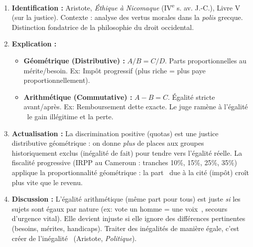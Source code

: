 \documentclass[11pt]{article}
\newcommand{\cle}[1]{{\popxbold\color{popdark}#1}}
\begin{document}
\begin{corrige}
\begin{enumerate}
    \item \textbf{Identification :} Aristote, \emph{Éthique à Nicomaque} (IV\textsuperscript{e} s. av. J.-C.), Livre V (sur la justice). Contexte : analyse des vertus morales dans la \emph{polis} grecque. Distinction fondatrice de la philosophie du droit occidental.
    \item \textbf{Explication :}
        \begin{itemize}
            \item \textbf{Géométrique (Distributive) :} $A/B = C/D$. Parts proportionnelles au mérite/besoin. Ex: Impôt progressif (plus riche = plus paye proportionnellement).
            \item \textbf{Arithmétique (Commutative) :} $A - B = C$. Égalité stricte avant/après. Ex: Remboursement dette exacte. Le juge \guillemotleft ramène à l'égalité \guillemotright\ le gain illégitime et la perte.
        \end{itemize}
    \item \textbf{Actualisation :} La \cle{discrimination positive} (quotas) est une justice distributive géométrique : on donne \emph{plus} de places aux groupes historiquement exclus (inégalité de fait) pour tendre vers l'égalité réelle. La fiscalité progressive (IRPP au Cameroun : tranches 10\%, 15\%, 25\%, 35\%) applique la proportionnalité géométrique : la \guillemotleft part \guillemotright\ due à la cité (impôt) croît plus vite que le revenu.
    \item \textbf{Discussion :} L'égalité arithmétique (même part pour tous) est juste \emph{si} les sujets sont égaux par nature (ex: vote \guillemotleft un homme = une voix \guillemotright\,, secours d'urgence vital). Elle devient injuste si elle ignore des différences pertinentes (besoins, mérites, handicaps). \guillemotleft Traiter des inégalités de manière égale, c'est créer de l'inégalité \guillemotright\ (Aristote, \emph{Politique}).
\end{enumerate}
\end{corrige}
\end{document}
